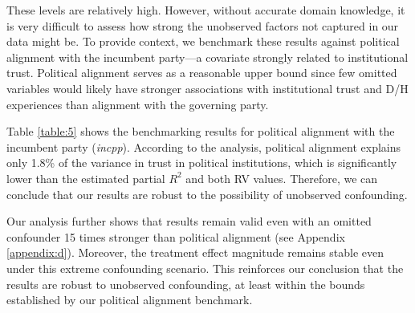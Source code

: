 \documentclass{article}
\begin{document}
These levels are relatively high. However, without accurate domain knowledge, it is very difficult to assess how strong the unobserved factors not captured in our data might be. To provide context, we benchmark these results against political alignment with the incumbent party—a covariate strongly related to institutional trust. Political alignment serves as a reasonable upper bound since few omitted variables would likely have stronger associations with institutional trust and D/H experiences than alignment with the governing party.

Table \ref{table:5} shows the benchmarking results for political alignment with the incumbent party (\emph{incpp}). According to the analysis, political alignment explains only 1.8\% of the variance in trust in political institutions, which is significantly lower than the estimated partial $R^2$ and both RV values. Therefore, we can conclude that our results are robust to the possibility of unobserved confounding.



Our analysis further shows that results remain valid even with an omitted confounder 15 times stronger than political alignment (see Appendix \ref{appendix:d}). Moreover, the treatment effect magnitude remains stable even under this extreme confounding scenario. This reinforces our conclusion that the results are robust to unobserved confounding, at least within the bounds established by our political alignment benchmark.



\end{document}
